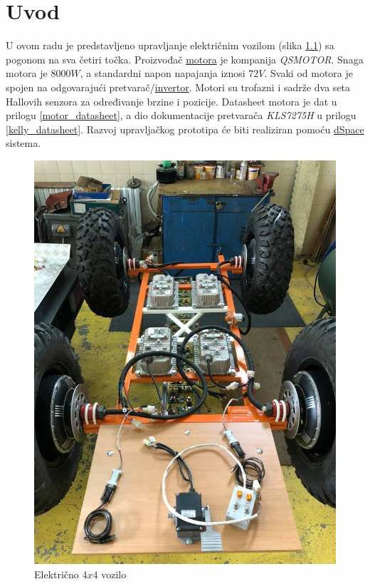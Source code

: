\chapter{Uvod}

\qquad U ovom radu je predstavljeno upravljanje električnim vozilom (slika \ref{fig:buggy}) sa pogonom na sva četiri točka. Proizvođač \href{https://www.qsmotor.com/product/8000w-car-motor/}{motora} je kompanija \textit{QSMOTOR}. Snaga motora je $8000W$, a standardni napon napajanja iznosi $72V$. Svaki od motora je spojen na odgovarajući pretvarač/\href{https://kellycontroller.com/shop/kls-h/}{invertor}. Motori su trofazni i sadrže dva seta Hallovih senzora za određivanje brzine i pozicije. Datasheet motora je dat u prilogu \ref{motor_datasheet}, a dio dokumentacije pretvarača \textit{KLS7275H} u prilogu \ref{kelly_datasheet}. Razvoj upravljačkog prototipa će biti realiziran pomoću \href{https://www.dspace.com/en/inc/home/products/hw/microlabbox.cfm?fbclid=IwAR08_hHwsXPVRs6ng2DLSU5HA3vDNzpBa9CMpO8DWlSQ1DXPK58BkLmoiRE}{dSpace} sistema.

\begin{figure}
\begin{center}
\includegraphics[scale=0.5]{slike/electric_car.jpg}
\end{center}
\caption{Električno $4x4$ vozilo}
\label{fig:buggy}
\end{figure}

